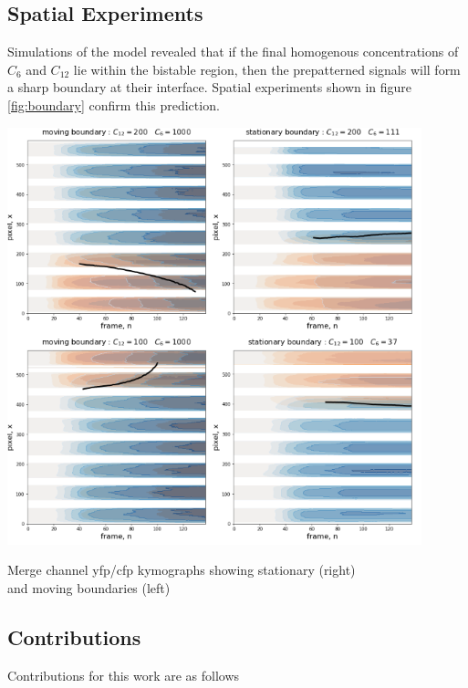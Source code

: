 \subsection{Spatial Experiments}
Simulations of the model revealed that if the final homogenous concentrations
of $C_6$ and $C_{12}$ lie within the bistable region, then the prepatterned
signals will form a sharp boundary at their interface. Spatial experiments
shown in figure \ref{fig:boundary} confirm this prediction.
\begin{Figure}
\includegraphics[width=120mm]{figures/spatial.png}
\caption{Merge channel yfp/cfp kymographs showing stationary (right)\\and moving boundaries (left)}
\label{fig:boundary}
\end{Figure}

\subsection{Contributions}
Contributions for this work are as follows


